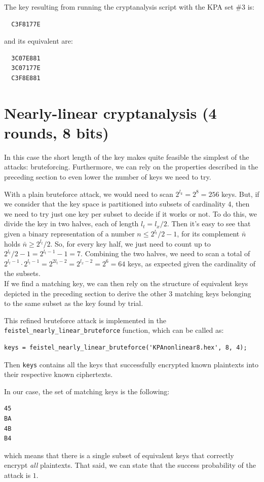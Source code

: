 \documentclass[a4paper,12pt,titlepage]{article}
\begin{document}
The key resulting from running the cryptanalysis script with the KPA set \#3 is:
\begin{verbatim}
  C3F8177E
\end{verbatim}

and its equivalent are:
\begin{verbatim}
  3C07E881
  3C07177E
  C3F8E881
\end{verbatim}

\section{Nearly-linear cryptanalysis (4 rounds, 8 bits)}
In this case the short length of the key makes quite feasible the simplest of
the attacks: bruteforcing. Furthermore, we can rely on the properties described
in the preceding section to even lower the number of keys we need to try.

With a plain bruteforce attack, we would need to scan $2^{l_k} = 2^8 = 256$
keys. But, if we consider that the key space is partitioned into subsets of
cardinality $4$, then we need to try just one key per subset to decide if it
works or not. To do this, we divide the key in two halves, each of length $l_t
= l_x / 2$. Then it's easy to see that given a binary representation of a
number $n \leq 2^{l_t}/2-1$, for its complement $\bar{n}$ holds $\bar{n} \geq
2^{l_t}/2$. So, for every key half, we just need to count up to $2^{l_t}/2-1 =
2^{l_t-1}-1 = 7$. Combining the two halves, we need to scan a total of
$2^{l_t-1} \cdot 2^{l_t-1} = 2^{2 l_t - 2} = 2^{l_x - 2} = 2^6 = 64$ keys, as
expected given the cardinality of the subsets. \\
If we find a matching key, we can then rely on the structure of equivalent keys
depicted in the preceding section to derive the other 3 matching keys belonging
to the same subset as the key found by trial.

This refined bruteforce attack is implemented in the
\texttt{feistel\_nearly\_linear\_bruteforce} function, which can be called as:
\begin{lstlisting}
keys = feistel_nearly_linear_bruteforce('KPAnonlinear8.hex', 8, 4);
\end{lstlisting}
Then \texttt{keys} contains all the keys that successfully encrypted known
plaintexts into their respective known ciphertexts.

In our case, the set of matching keys is the following:
\begin{verbatim}
45
BA
4B
B4
\end{verbatim}
which means that there is a single subset of equivalent keys that correctly
encrypt \emph{all} plaintexts. That said, we can state that the success
probability of the attack is $1$.
\end{document}

